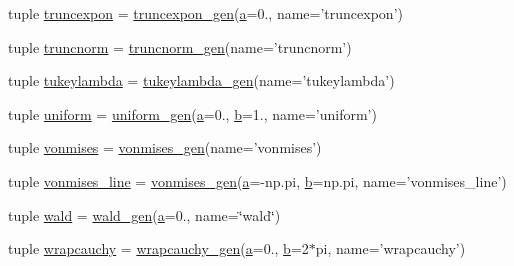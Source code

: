 \begin{DoxyCompactItemize}
\item 
tuple \hyperlink{namespacescipy_1_1stats_1_1__continuous__distns_ab888ce99139533dc32435fdb97e0baa1}{truncexpon} = \hyperlink{classscipy_1_1stats_1_1__continuous__distns_1_1truncexpon__gen}{truncexpon\+\_\+gen}(\hyperlink{gen__mat5files_8m_aae328bf20413f220e38aec4d95bfd6da}{a}=0., name='truncexpon')
\item 
tuple \hyperlink{namespacescipy_1_1stats_1_1__continuous__distns_a92f75caa0cf90f5396f170249830fcec}{truncnorm} = \hyperlink{classscipy_1_1stats_1_1__continuous__distns_1_1truncnorm__gen}{truncnorm\+\_\+gen}(name='truncnorm')
\item 
tuple \hyperlink{namespacescipy_1_1stats_1_1__continuous__distns_adf845efe31b69b1e1a3ca9de1fe2858c}{tukeylambda} = \hyperlink{classscipy_1_1stats_1_1__continuous__distns_1_1tukeylambda__gen}{tukeylambda\+\_\+gen}(name='tukeylambda')
\item 
tuple \hyperlink{namespacescipy_1_1stats_1_1__continuous__distns_ad36f112cf65a698eb6e7f8a98dddb9cd}{uniform} = \hyperlink{classscipy_1_1stats_1_1__continuous__distns_1_1uniform__gen}{uniform\+\_\+gen}(\hyperlink{gen__mat5files_8m_aae328bf20413f220e38aec4d95bfd6da}{a}=0., \hyperlink{gen__mat5files_8m_a7b38767b3b6a8dae167e5afa4fc340b0}{b}=1., name='uniform')
\item 
tuple \hyperlink{namespacescipy_1_1stats_1_1__continuous__distns_a1f21f2410a29da813034d9602e756fd5}{vonmises} = \hyperlink{classscipy_1_1stats_1_1__continuous__distns_1_1vonmises__gen}{vonmises\+\_\+gen}(name='vonmises')
\item 
tuple \hyperlink{namespacescipy_1_1stats_1_1__continuous__distns_a8065007164ec3a24214aaee219658e85}{vonmises\+\_\+line} = \hyperlink{classscipy_1_1stats_1_1__continuous__distns_1_1vonmises__gen}{vonmises\+\_\+gen}(\hyperlink{gen__mat5files_8m_aae328bf20413f220e38aec4d95bfd6da}{a}=-\/np.\+pi, \hyperlink{gen__mat5files_8m_a7b38767b3b6a8dae167e5afa4fc340b0}{b}=np.\+pi, name='vonmises\+\_\+line')
\item 
tuple \hyperlink{namespacescipy_1_1stats_1_1__continuous__distns_a1f8fed0ad9e61a108edd95e01446c25d}{wald} = \hyperlink{classscipy_1_1stats_1_1__continuous__distns_1_1wald__gen}{wald\+\_\+gen}(\hyperlink{gen__mat5files_8m_aae328bf20413f220e38aec4d95bfd6da}{a}=0., name=\char`\"{}wald\char`\"{})
\item 
tuple \hyperlink{namespacescipy_1_1stats_1_1__continuous__distns_a66f4ceb22239ae804f207e3dcb6bcc4b}{wrapcauchy} = \hyperlink{classscipy_1_1stats_1_1__continuous__distns_1_1wrapcauchy__gen}{wrapcauchy\+\_\+gen}(\hyperlink{gen__mat5files_8m_aae328bf20413f220e38aec4d95bfd6da}{a}=0., \hyperlink{gen__mat5files_8m_a7b38767b3b6a8dae167e5afa4fc340b0}{b}=2$\ast$pi, name='wrapcauchy')
\end{DoxyCompactItemize}


